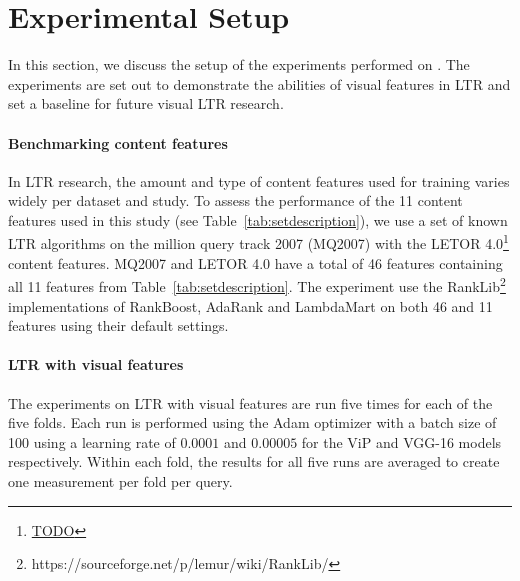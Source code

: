 
\section{Experimental Setup}\label{sec:experiments}
In this section, we discuss the setup of the experiments performed on \datasetname. The experiments are set out to demonstrate the abilities of visual features in LTR and set a baseline for future visual LTR research.

\paragraph{Benchmarking content features}
In \ac{LTR} research, the amount and type of content features used for training varies widely per dataset and study.
To assess the performance of the 11 content features used in this study (see Table~\ref{tab:setdescription}), we use a set of known LTR algorithms on the million query track 2007 (MQ2007) with the LETOR 4.0\footnote{\url{TODO}} content features.
MQ2007 and LETOR 4.0 have a total of 46 features containing all 11 features from Table~\ref{tab:setdescription}.
The experiment use the RankLib\footnote{https://sourceforge.net/p/lemur/wiki/RankLib/} implementations of RankBoost, AdaRank and LambdaMart on both 46 and 11 features using their default settings. 

\paragraph{\ac{LTR} with visual features}
The experiments on \ac{LTR} with visual features are run five times for each of the five folds. 
Each run is performed using the Adam optimizer with a batch size of 100 using a learning rate of $0.0001$ and $0.00005$ for the ViP and VGG-16 models respectively.
Within each fold, the results for all five runs are averaged to create one measurement per fold per query.

